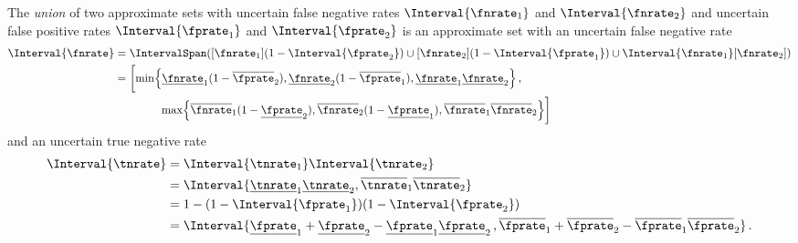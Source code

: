 \documentclass[ ../main.tex]{subfiles}
\begin{document}
\begin{theorem}
	\label{thm:uncertain_rates_union_set}
	The \emph{union} of two approximate sets with uncertain false negative 
	rates 
	$\Interval{\fnrate_1}$ and $\Interval{\fnrate_2}$ and uncertain false 
	positive rates $\Interval{\fprate_1}$ and $\Interval{\fprate_2}$ is an 
	approximate set with an uncertain false negative rate
	\begin{equation}
	\label{eq:fnrate_union_set}
	\begin{split}
	\Interval{\fnrate}
	&= \IntervalSpan([\fnrate_1](1 - \Interval{\fprate_2}) \cup  
	[\fnrate_2] (1 - \Interval{\fprate_1}) \cup 
	\Interval{\fnrate_1}[\fnrate_2])\\
	&= \biggl[
	\min\!\left\{
	\underline{\fnrate}_1(1 - \overline{\fprate}_2),
	\underline{\fnrate}_2(1 - \overline{\fprate}_1),
	\underline{\fnrate}_1 \underline{\fnrate}_2
	\right\},\\
	& \qquad \qquad \max\!\left\{
	\overline{\fnrate}_1(1 - \underline{\fprate}_2),
	\overline{\fnrate}_2(1 - \underline{\fprate}_1),
	\overline{\fnrate}_1 \overline{\fnrate}_2\right\}
	\biggr]
	\end{split}
	\end{equation}
	and an uncertain true negative rate
	\begin{equation}
	\label{eq:fprate_union_set}
	\begin{split}
	\Interval{\tnrate}
	&= \Interval{\tnrate_1}\Interval{\tnrate_2}\\
	&= \Interval{
		\underline{\tnrate}_1 \underline{\tnrate}_2,
		\overline{\tnrate}_1 \overline{\tnrate}_2}\\
	&= 1-(1-\Interval{\fprate_1})(1-\Interval{\fprate_2})\\
	&= \Interval{
		\underline{\fprate}_1 + \underline{\fprate}_2 - 
		\underline{\fprate}_1 \underline{\fprate}_2\,, \overline{\fprate}_1 
		+ \overline{\fprate}_2 - \overline{\fprate}_1 \overline{\fprate}_2}\,.
	\end{split}
	\end{equation}
\end{theorem}
\end{document}
